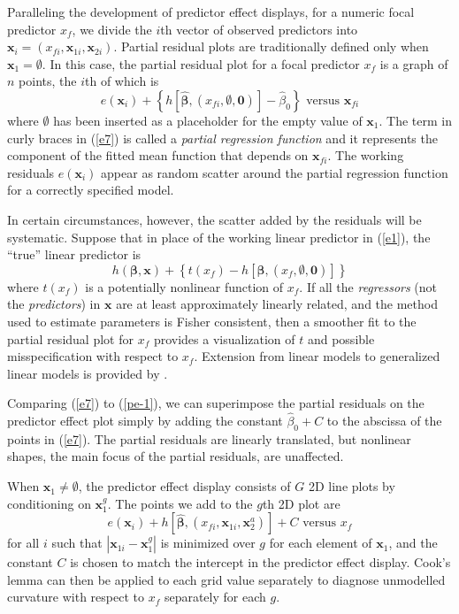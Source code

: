 \documentclass[article]{jss}
\newcommand{\x}{\mathbf{x}}
\newcommand{\betahat}{\widehat{\beta}}
\newcommand{\bbetahat}{\widehat{\boldsymbol{\beta}}}
\newcommand{\bbeta}{\boldsymbol{\beta}}
\begin{document}
Paralleling the development of predictor effect displays, for a numeric focal predictor $x_f$, we divide the $i$th vector of observed predictors into $\x_i = (x_{fi}, \x_{1i}, \x_{2i})$.  Partial residual plots are traditionally defined only when $\x_1 = \emptyset$.  In this case, the partial residual plot for a focal predictor $x_f$ is a graph of $n$ points, the $i$th of which is
\begin{equation}
 e(\x_i) + \left\{h[\bbetahat, (x_{fi}, \emptyset, \textbf{0})] - \betahat_0 \right\}  \textrm{ versus } \x_{fi} \label{e7}
\end{equation}
where $\emptyset$ has been inserted as a placeholder for the empty value of $\x_1$. The term in curly braces in (\ref{e7}) is called a \emph{partial regression function} and it represents the component of the fitted mean function that depends on $\x_{fi}$. The working residuals $e(\x_i)$ appear as random scatter around the partial regression function for a correctly specified model.

In certain circumstances, however, the scatter added by the residuals will be systematic. Suppose that in place of the working linear predictor in (\ref{e1}), the ``true'' linear predictor is
\begin{equation}
h(\bbeta, \x) +
          \left\{t(x_f) - h\left[\bbeta, (x_f, \emptyset, \mathbf{0})\right]\right\}  \label{e8}
\end{equation}
where $t(x_f)$ is a potentially nonlinear function of $x_f$.  If all the \emph{regressors} (not the \emph{predictors}) in $\x$ are at least approximately linearly related, and the  method used to estimate parameters is Fisher consistent, then a smoother fit to the partial residual plot for $x_f$ provides a visualization of $t$ \citep[Lemma 2.1]{Cook93} and possible misspecification with respect to $x_f$.  Extension from linear models to generalized linear models is provided by \citet{CookCroos98}.

Comparing (\ref{e7}) to (\ref{pe-1}), we can superimpose the partial residuals on the predictor effect plot simply by adding the constant $\betahat_0 + C$ to the abscissa of the points in (\ref{e7}).  The partial residuals are linearly translated, but nonlinear shapes, the main focus of the partial residuals, are unaffected.

When $\x_1 \neq \emptyset$, the predictor effect display consists of $G$ 2D line plots by conditioning on $\x_1^g$.  The points we add to the $g$th 2D plot are
\begin{equation}
e(\x_i) + h\left[\bbetahat, (x_{fi}, \x_{1i}, \x_2^a)\right] + C  \textrm{ versus } x_{f} \label{pe-4}
\end{equation}
for all $i$ such that $|\x_{1i} - \x_{1}^g|$ is minimized over $g$ for each element of $\x_{1}$, and the constant $C$ is chosen to match the intercept in the predictor effect display.   Cook's lemma can then be applied to each grid value separately to diagnose unmodelled curvature with respect to $x_f$ separately for each $g$.
\end{document}
